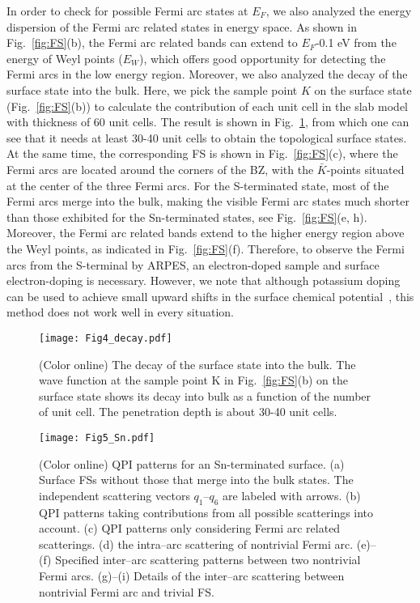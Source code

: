 \documentclass[aps,prb,reprint,superscriptaddress,amssymb,amsmath]{revtex4-1}
\begin{document}
In order to check for possible Fermi arc states at $E_F$, we also analyzed the energy dispersion of the Fermi arc related states in energy space. 
As shown in Fig.~\ref{fig:FS}(b), the Fermi arc related bands can extend to $E_F$-0.1 eV from the energy of Weyl points ($E_W$), 
which offers good opportunity for detecting the Fermi arcs in the low energy region. 
Moreover, we also analyzed the decay of the surface state into the bulk.
Here, we pick the sample point $K$ on the surface state (Fig.~\ref{fig:FS}(b))              
to calculate the contribution of each unit cell in the slab model with thickness of 60 unit cells.
The result is shown in Fig.~\ref{fig:decay}, from which one can see that it needs at least 
30-40 unit cells to obtain the topological surface states.
At the same time, the corresponding FS is shown in Fig.~\ref{fig:FS}(c), 
where the Fermi arcs are located around the corners of the BZ, with the $\bar{K}$-points situated at the center of the three Fermi arcs. 
For the S-terminated state, most of the Fermi arcs merge into the bulk, making the visible Fermi arc states much shorter than those exhibited for the Sn-terminated states, 
see Fig.~\ref{fig:FS}(e, h). Moreover, the Fermi arc related bands extend to the higher energy region above the Weyl points, 
as indicated in Fig.~\ref{fig:FS}(f). Therefore, to observe the Fermi arcs from the S-terminal by ARPES, 
an electron-doped sample and surface electron-doping is necessary. 
However, we note that although potassium doping can be used to achieve small upward shifts in the surface chemical potential~\cite{Hossain2008}, 
this method does not work well in every situation.

\begin{figure}[htb]
\centering
\texttt{[image: Fig4\_decay.pdf]}
   \caption{
(Color online) The decay of the surface state into the bulk. 
The wave function at the sample point K in Fig.~\ref{fig:FS}(b) on the surface state shows its decay into bulk as a function of the number of unit cell. The penetration depth is about 30-40 unit cells.
 }
\label{fig:decay}
\end{figure}


\begin{figure*}[htb]
\centering
\texttt{[image: Fig5\_Sn.pdf]}
   \caption{
(Color online) QPI patterns for an Sn-terminated surface.
(a) Surface FSs without those that merge into the bulk states. The independent scattering vectors $q_1$--$q_6$ are labeled with arrows.
(b) QPI patterns taking contributions from all possible scatterings into account. 
(c) QPI patterns only considering Fermi arc related scatterings.
(d) the intra--arc scattering of nontrivial Fermi arc.
(e)--(f) Specified inter--arc scattering patterns between two nontrivial Fermi arcs. 
(g)--(i) Details of the inter--arc scattering between nontrivial Fermi arc and trivial FS.
}
\label{fig:Sn}
\end{figure*}
\end{document}
